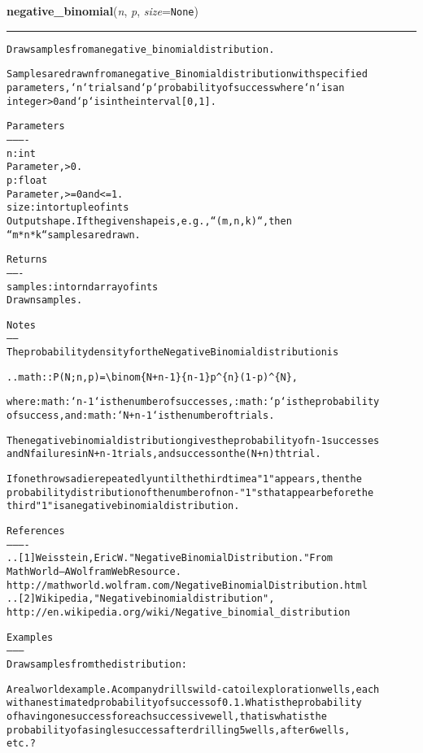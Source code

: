 \hspace{.8\funcindent}\begin{boxedminipage}{\funcwidth}

    \raggedright \textbf{negative\_binomial}(\textit{n}, \textit{p}, \textit{size}={\tt None})

    \vspace{-1.5ex}

    \rule{\textwidth}{0.5\fboxrule}
\setlength{\parskip}{2ex}
\begin{alltt}
Draw samples from a negative\_binomial distribution.

Samples are drawn from a negative\_Binomial distribution with specified
parameters, `n` trials and `p` probability of success where `n` is an
integer {\textgreater} 0 and `p` is in the interval [0, 1].

Parameters
----------
n : int
    Parameter, {\textgreater} 0.
p : float
    Parameter, {\textgreater}= 0 and {\textless}=1.
size : int or tuple of ints
    Output shape. If the given shape is, e.g., ``(m, n, k)``, then
    ``m * n * k`` samples are drawn.

Returns
-------
samples : int or ndarray of ints
    Drawn samples.

Notes
-----
The probability density for the Negative Binomial distribution is

.. math:: P(N;n,p) = {\textbackslash}binom\{N+n-1\}\{n-1\}p{\textasciicircum}\{n\}(1-p){\textasciicircum}\{N\},

where :math:`n-1` is the number of successes, :math:`p` is the probability
of success, and :math:`N+n-1` is the number of trials.

The negative binomial distribution gives the probability of n-1 successes
and N failures in N+n-1 trials, and success on the (N+n)th trial.

If one throws a die repeatedly until the third time a "1" appears, then the
probability distribution of the number of non-"1"s that appear before the
third "1" is a negative binomial distribution.

References
----------
.. [1] Weisstein, Eric W. "Negative Binomial Distribution." From
       MathWorld--A Wolfram Web Resource.
       http://mathworld.wolfram.com/NegativeBinomialDistribution.html
.. [2] Wikipedia, "Negative binomial distribution",
       http://en.wikipedia.org/wiki/Negative\_binomial\_distribution

Examples
--------
Draw samples from the distribution:

A real world example. A company drills wild-cat oil exploration wells, each
with an estimated probability of success of 0.1.  What is the probability
of having one success for each successive well, that is what is the
probability of a single success after drilling 5 wells, after 6 wells,
etc.?


\end{alltt}
\end{boxedminipage}
